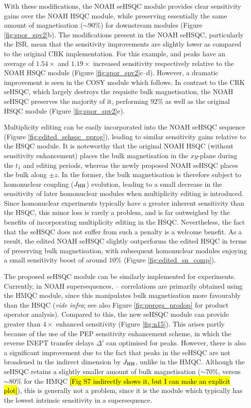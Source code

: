 \documentclass[11pt]{article}
\newcommand*{\proton}{\ce{^{1}H}}
\newcommand*{\nitrogen}{\ce{^{15}N}}
\newcommand*{\jhh}{J_{\ce{HH}}}
\newcommand*{\figref}[1]{Figure \ref{fig:#1}}
\begin{document}
With these modifications, the NOAH seHSQC module provides clear sensitivity gains over the NOAH HSQC module, while preserving essentially the same amount of \proton{} magnetisation ($\sim 90\%$) for downstream modules (\figref{spor_spv2}b).
The modifications present in the NOAH seHSQC, particularly the ISR, mean that the sensitivity improvements are slightly lower as compared to the original CRK implementation.
For this example,  and  peaks have an average of $1.54\times$ and $1.19\times$ increased sensitivity respectively relative to the NOAH HSQC module (\figref{spor_spv2}c--d).
However, a dramatic improvement is seen in the COSY module which follows.
In contrast to the CRK seHSQC, which largely destroys the requisite bulk magnetisation, the NOAH seHSQC preserves the majority of it, performing 92\% as well as the original HSQC module (\figref{spor_spv2}e).

Multiplicity editing can be easily incorporated into the NOAH seHSQC sequence (\figref{edited_sehsqc_pprog}), leading to similar sensitivity gains relative to the HSQC module.
It is noteworthy that the original NOAH HSQC (without sensitivity enhancement) places the bulk magnetisation in the $xy$-plane during the $t_1$ and editing periods, whereas the newly proposed NOAH seHSQC places the bulk along $\pm z$.
In the former, the bulk magnetisation is therefore subject to homonuclear coupling ($\jhh$) evolution, leading to a small decrease in the sensitivity of later homonuclear modules when multiplicity editing is introduced.
Since homonuclear experiments typically have a greater inherent sensitivity than the HSQC, this minor loss is rarely a problem, and is far outweighed by the benefits of incorporating multiplicity editing in the HSQC.
Nevertheless, the fact that the seHSQC does not suffer from such a penalty is a welcome benefit.
As a result, the edited NOAH seHSQC slightly outperforms the edited HSQC in terms of preserving bulk magnetisation, with subsequent homonuclear modules enjoying a small sensitivity boost of around $10\%$ (\figref{edited_sn_comp}).

The proposed seHSQC module can be similarly implemented for \nitrogen{} experiments.
Currently, in NOAH supersequences, \nitrogen{}--\proton{} correlations are primarily obtained using the HMQC module, since this manipulates bulk magnetisation more favourably than the HSQC (\textit{vide infra}; see also \figref{pprogs_prodop} for product operator analysis).\autocite{Kupce2007MRC, Kupce2017ACIE}
Compared to this, the new seHSQC module can provide greater than $4\times$ enhanced sensitivity (\figref{n15}).
This arises partly because of the use of the PEP sensitivity enhancement scheme, in which the reverse INEPT transfer delays $\Delta'$ can optimised for  peaks.
However, there is also a significant improvement due to the fact that peaks in the \nitrogen{} seHSQC are not broadened in the indirect dimension by $\jhh$, unlike in the HMQC.
Although the seHSQC retains a slightly smaller amount of bulk magnetisation ($\sim 70\%$, versus $\sim 80\%$ for the HMQC \hl{[Fig S7 indirectly shows it, but I can make an explicit plot]}), this is generally not a problem, since it is the \nitrogen{} module which typically has the lowest intrinsic sensitivity in a supersequence.
\end{document}
